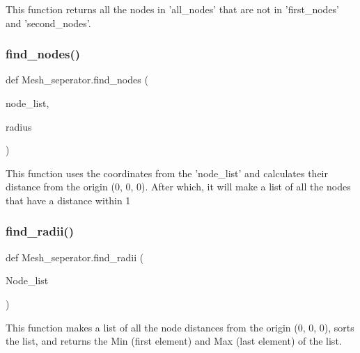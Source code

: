 \begin{DoxyVerb}This function returns all the nodes in 'all_nodes' that are not in 'first_nodes' and 'second_nodes'.
\end{DoxyVerb}
 \mbox{\label{namespaceMesh__seperator_a620490c6c76a9ea91bd73f274436796e}} 
\subsubsection{\texorpdfstring{find\_nodes()}{find\_nodes()}}
{\footnotesize\ttfamily def Mesh\+\_\+seperator.\+find\+\_\+nodes (\begin{DoxyParamCaption}\item[{}]{node\+\_\+list,  }\item[{}]{radius }\end{DoxyParamCaption})}

\begin{DoxyVerb}This function uses the coordinates from the 'node_list' and calculates their distance from the origin (0, 0, 0).
After which, it will make a list of all the nodes that have a distance within 1%
\end{DoxyVerb}
 \mbox{\label{namespaceMesh__seperator_aff846c342f17725ec1ff053e3ebeace6}} 
\subsubsection{\texorpdfstring{find\_radii()}{find\_radii()}}
{\footnotesize\ttfamily def Mesh\+\_\+seperator.\+find\+\_\+radii (\begin{DoxyParamCaption}\item[{}]{Node\+\_\+list }\end{DoxyParamCaption})}

\begin{DoxyVerb}This function makes a list of all the node distances from the origin (0, 0, 0), sorts the list, 
and returns the Min (first element) and Max (last element) of the list. 
\end{DoxyVerb}
 \mbox{\label{namespaceMesh__seperator_a46da65de297af581c00aad6ab0a4853c}} 
